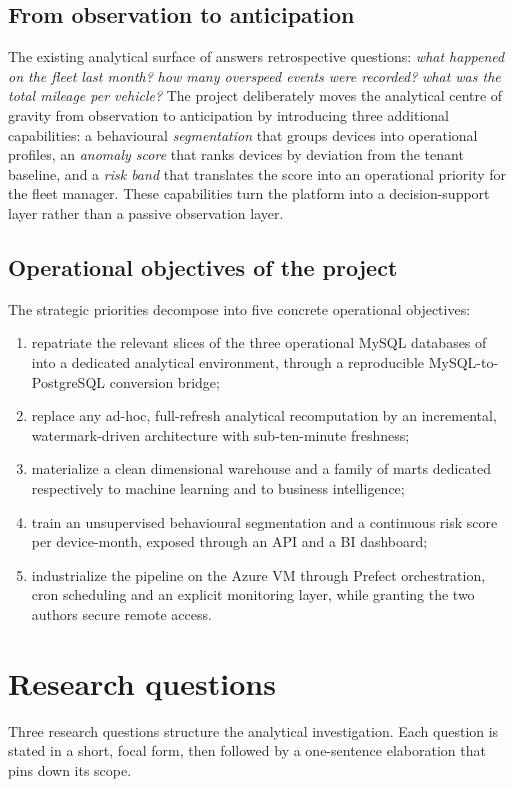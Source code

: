 \subsection{From observation to anticipation}
The existing analytical surface of \hostorg{} answers retrospective questions: \emph{what happened on the fleet last month?} \emph{how many overspeed events were recorded?} \emph{what was the total mileage per vehicle?} The project deliberately moves the analytical centre of gravity from observation to anticipation by introducing three additional capabilities: a behavioural \emph{segmentation} that groups devices into operational profiles, an \emph{anomaly score} that ranks devices by deviation from the tenant baseline, and a \emph{risk band} that translates the score into an operational priority for the fleet manager. These capabilities turn the platform into a decision-support layer rather than a passive observation layer.

\subsection{Operational objectives of the project}
The strategic priorities decompose into five concrete operational objectives:

\begin{enumerate}
    \item repatriate the relevant slices of the three operational MySQL databases of \hostorg{} into a dedicated analytical environment, through a reproducible MySQL-to-PostgreSQL conversion bridge;
    \item replace any ad-hoc, full-refresh analytical recomputation by an incremental, watermark-driven architecture with sub-ten-minute freshness;
    \item materialize a clean dimensional warehouse and a family of marts dedicated respectively to machine learning and to business intelligence;
    \item train an unsupervised behavioural segmentation and a continuous risk score per device-month, exposed through an API and a BI dashboard;
    \item industrialize the pipeline on the Azure VM through Prefect orchestration, cron scheduling and an explicit monitoring layer, while granting the two authors secure remote access.
\end{enumerate}

\section{Research questions}
\label{sec:research-questions}
Three research questions structure the analytical investigation. Each question is stated in a short, focal form, then followed by a one-sentence elaboration that pins down its scope.

